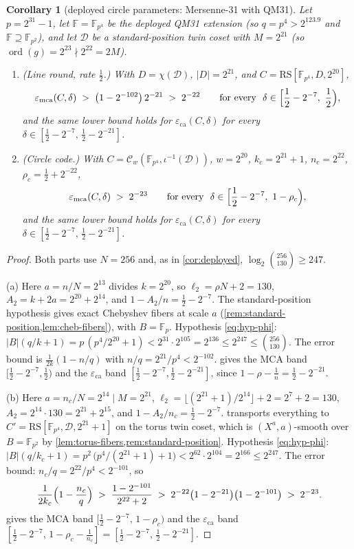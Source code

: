 \documentclass[11pt]{article}
\newtheorem{corollary}[corollary]{Corollary}
\theoremstyle{definition}
\theoremstyle{remark}
\newcommand{\F}{\mathbb{F}}
\newcommand{\B}{B}
\newcommand{\RS}{\mathrm{RS}}
\newcommand{\eca}{\varepsilon_{\mathrm{ca}}}
\newcommand{\emca}{\varepsilon_{\mathrm{mca}}}
\begin{document}
\begin{corollary}[deployed circle parameters: Mersenne-31 with QM31]\label{cor:circle-deployed}
Let $p=2^{31}-1$, let $\F=\F_{p^4}$ be the deployed QM31 extension \textup(so $q=p^4>2^{123.9}$ and $\F\supseteq\F_{p^2}$\textup), and let $\mathcal D$ be a standard-position twin coset with $M=2^{21}$ \textup(so $\operatorname{ord}(g)=2^{23}\nmid2^{22}=2M$\textup).
\begin{enumerate}[label=\textup{(\alph*)}]
\item \textup{(Line round, rate $\frac12$.)} With $D=\chi(\mathcal D)$, $|D|=2^{21}$, and $C=\RS[\F_{p^4},D,2^{20}]$,
\[
\emca(C,\delta)\;>\;\bigl(1-2^{-102}\bigr)\,2^{-21}\;>\;2^{-22}
\qquad\text{for every }\ \delta\in\Bigl[\frac12-2^{-7},\ \frac12\Bigr),
\]
and the same lower bound holds for $\eca(C,\delta)$ for every $\delta\in[\frac12-2^{-7},\,\frac12-2^{-21}]$.
\item \textup{(Circle code.)} With $C=\mathcal C_w(\F_{p^4},\iota^{-1}(\mathcal D))$, $w=2^{20}$, $k_c=2^{21}+1$, $n_c=2^{22}$, $\rho_c=\frac12+2^{-22}$,
\[
\emca(C,\delta)\;>\;2^{-23}
\qquad\text{for every }\ \delta\in\Bigl[\frac12-2^{-7},\ 1-\rho_c\Bigr),
\]
and the same lower bound holds for $\eca(C,\delta)$ for every $\delta\in[\frac12-2^{-7},\,\frac12-2^{-21}]$.
\end{enumerate}
\end{corollary}

\begin{proof}
Both parts use $N=256$ and, as in \cref{cor:deployed}, $\log_2\binom{256}{130}\ge247$.

(a) Here $a=n/N=2^{13}$ divides $k=2^{20}$, so $\ell_2=\rho N+2=130$, $A_2=k+2a=2^{20}+2^{14}$, and $1-A_2/n=\frac12-2^{-7}$. The standard-position hypothesis gives exact Chebyshev fibers at scale $a$ (\cref{rem:standard-position,lem:cheb-fibers}), with $\B=\F_p$. Hypothesis \eqref{eq:hyp-phi}: $|\B|(q/k+1)=p\,(p^4/2^{20}+1)<2^{31}\cdot2^{105}=2^{136}\le2^{247}\le\binom{256}{130}$. The error bound is $\frac1{2k}(1-n/q)$ with $n/q=2^{21}/p^4<2^{-102}$.  gives the MCA band $[\frac12-2^{-7},\frac12)$ and the $\eca$ band $[\frac12-2^{-7},\frac12-2^{-21}]$, since $1-\rho-\frac1n=\frac12-2^{-21}$.

(b) Here $a=n_c/N=2^{14}\mid M=2^{21}$, $\ell_2=\lfloor(2^{21}+1)/2^{14}\rfloor+2=2^7+2=130$, $A_2=2^{14}\cdot130=2^{21}+2^{15}$, and $1-A_2/n_c=\frac12-2^{-7}$.  transports everything to $C'=\RS[\F_{p^4},\mathcal D,2^{21}+1]$ on the torus twin coset, which is $(X^a,a)$-smooth over $\B=\F_{p^2}$ by \cref{lem:torus-fibers,rem:standard-position}. Hypothesis \eqref{eq:hyp-phi}: $|\B|(q/k_c+1)=p^2\,\bigl(p^4/(2^{21}+1)+1\bigr)<2^{62}\cdot2^{104}=2^{166}\le2^{247}$. The error bound: $n_c/q=2^{22}/p^4<2^{-101}$, so
\[
\frac1{2k_c}\Bigl(1-\frac{n_c}q\Bigr)\;>\;\frac{1-2^{-101}}{2^{22}+2}\;>\;2^{-22}\bigl(1-2^{-21}\bigr)\bigl(1-2^{-101}\bigr)\;>\;2^{-23}.
\]
 gives the MCA band $[\frac12-2^{-7},\,1-\rho_c)$ and the $\eca$ band $[\frac12-2^{-7},\,1-\rho_c-\frac1{n_c}]=[\frac12-2^{-7},\,\frac12-2^{-21}]$.
\end{proof}
\end{document}
